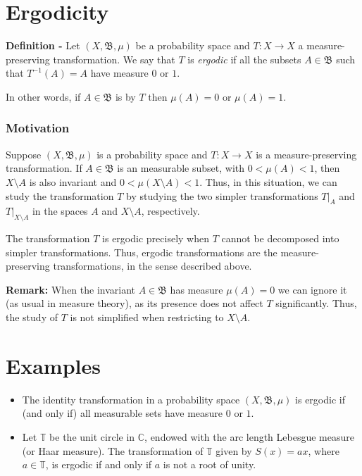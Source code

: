 \documentclass[12pt]{article}
\begin{document}

\section{Ergodicity}

{\bf Definition -} Let $(X, \mathfrak{B}, \mu)$ be a probability space and $T:X \longrightarrow X$ a measure-preserving transformation.  We say that $T$ is \emph{ergodic} if all the subsets $A \in \mathfrak{B}$ such that $T^{-1}(A)=A$ have measure $0$ or $1$.

In other words, if $A \in \mathfrak{B}$ is  by $T$ then $\mu(A) = 0$ or $\mu(A)=1$.\\

\subsubsection{Motivation}

Suppose $(X, \mathfrak{B}, \mu)$ is a probability space and $T:X \longrightarrow X$ is a measure-preserving transformation. If $A \in \mathfrak{B}$ is an  measurable subset, with $0 < \mu(A) < 1$, 
then $X \setminus A$ is also invariant and $0 < \mu(X \setminus A) < 1$. Thus, in this situation, we can study the transformation $T$ by studying the two simpler transformations $T|_{A}$ and $T|_{X \setminus A}$ in the spaces $A$ and $X \setminus A$, respectively.

The transformation $T$ is ergodic precisely when $T$ cannot be decomposed into simpler transformations. Thus, ergodic transformations are the \emph{} measure-preserving transformations, in the sense described above.

{\bf Remark:} When the invariant  $A \in \mathfrak{B}$ has measure $\mu(A)=0$ we can ignore it (as usual in measure theory), as its presence does not affect $T$ significantly. Thus, the study of $T$ is not simplified when restricting to $X \setminus A$.

\section{Examples}

\begin{itemize}
\item The identity transformation in a probability space $(X, \mathfrak{B}, \mu)$ is ergodic if (and only if) all measurable sets have measure $0$ or $1$.
\end{itemize}
\begin{itemize}
\item Let $\mathbb{T}$ be the unit circle in $\mathbb{C}$, endowed with the arc length Lebesgue measure (or Haar measure). The transformation of $\mathbb{T}$ given by $S(x)= ax$, where $a \in \mathbb{T}$, is ergodic if and only if $a$ is not a root of unity.
\end{itemize}
\end{document}
